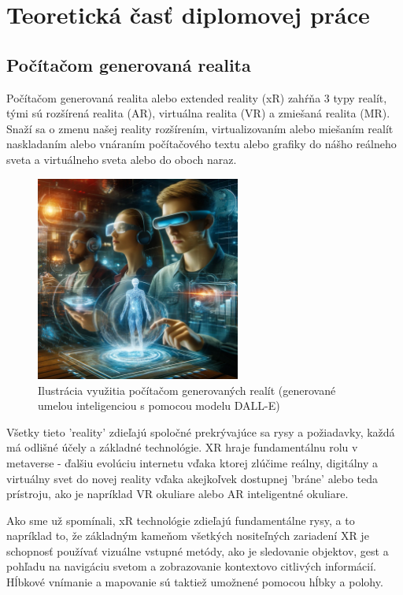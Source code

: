 \section{Teoretická časť diplomovej práce}

\subsection{Počítačom generovaná realita}

Počítačom generovaná realita alebo extended reality (xR) zahŕňa 3 typy realít, tými sú rozšírená realita (AR), virtuálna realita (VR) a zmiešaná realita (MR). Snaží sa o zmenu našej reality rozšírením, virtualizovaním alebo miešaním realít naskladaním alebo vnáraním počítačového textu alebo grafiky do nášho reálneho sveta a virtuálneho sveta alebo do oboch naraz. 

\begin{figure}[h]
  \centering
  \includegraphics[width=0.6\textwidth]{img/Pocitacom_generovana_realita.png}
  \caption{Ilustrácia využitia počítačom generovaných realít (generované umelou inteligenciou s pomocou modelu DALL-E)}
  \label{fig:poc_gen_real}
\end{figure}

Všetky tieto 'reality' zdieľajú spoločné prekrývajúce sa rysy a požiadavky, každá má odlišné účely a základné technológie. XR hraje fundamentálnu rolu v metaverse - ďalšiu evolúciu internetu vďaka ktorej zlúčime reálny, digitálny a virtuálny svet do novej reality vďaka akejkoľvek dostupnej 'bráne' alebo teda prístroju, ako je napríklad VR okuliare alebo AR inteligentné okuliare. 

Ako sme už spomínali, xR technológie zdieľajú fundamentálne rysy, a to napríklad to, že základným kameňom všetkých nositeľných zariadení XR je schopnosť používať vizuálne vstupné metódy, ako je sledovanie objektov, gest a pohľadu na navigáciu svetom a zobrazovanie kontextovo citlivých informácií. Hĺbkové vnímanie a mapovanie sú taktiež umožnené pomocou hĺbky a polohy. 

